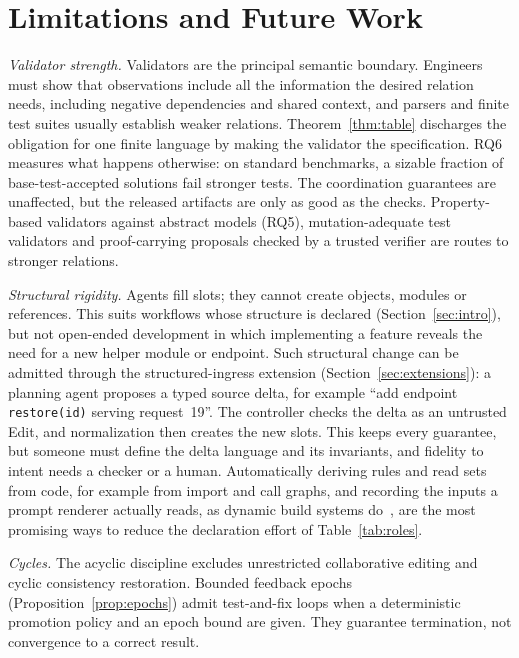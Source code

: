 \section{Limitations and Future Work}\label{sec:limitations}
\emph{Validator strength.} Validators are the principal semantic boundary. Engineers must show that observations include all the information the desired relation needs, including negative dependencies and shared context, and parsers and finite test suites usually establish weaker relations. Theorem~\ref{thm:table} discharges the obligation for one finite language by making the validator the specification. RQ6 measures what happens otherwise: on standard benchmarks, a sizable fraction of base-test-accepted solutions fail stronger tests. The coordination guarantees are unaffected, but the released artifacts are only as good as the checks. Property-based validators against abstract models (RQ5), mutation-adequate test validators and proof-carrying proposals checked by a trusted verifier are routes to stronger relations.

\emph{Structural rigidity.} Agents fill slots; they cannot create objects, modules or references. This suits workflows whose structure is declared (Section~\ref{sec:intro}), but not open-ended development in which implementing a feature reveals the need for a new helper module or endpoint. Such structural change can be admitted through the structured-ingress extension (Section~\ref{sec:extensions}): a planning agent proposes a typed source delta, for example ``add endpoint \texttt{restore(id)} serving request~19''. The controller checks the delta as an untrusted Edit, and normalization then creates the new slots. This keeps every guarantee, but someone must define the delta language and its invariants, and fidelity to intent needs a checker or a human. Automatically deriving rules and read sets from code, for example from import and call graphs, and recording the inputs a prompt renderer actually reads, as dynamic build systems do~\cite{erdweg2015pluto}, are the most promising ways to reduce the declaration effort of Table~\ref{tab:roles}.

\emph{Cycles.} The acyclic discipline excludes unrestricted collaborative editing and cyclic consistency restoration. Bounded feedback epochs (Proposition~\ref{prop:epochs}) admit test-and-fix loops when a deterministic promotion policy and an epoch bound are given. They guarantee termination, not convergence to a correct result.

